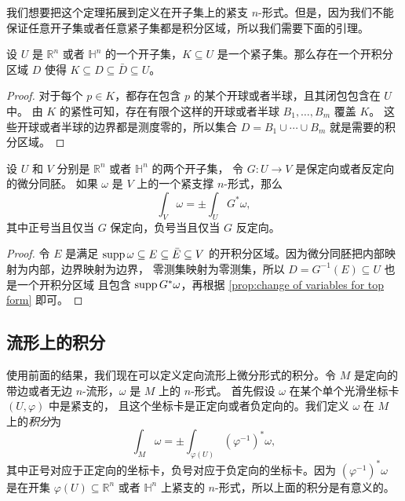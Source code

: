 我们想要把这个定理拓展到定义在开子集上的紧支 $n$-形式。但是，因为我们不能
保证任意开子集或者任意紧子集都是积分区域，所以我们需要下面的引理。

\begin{lemma}
  设 $U$ 是 $\mathbb{R}^n$ 或者 $\mathbb{H}^n$ 的一个开子集，$K\subseteq U$
  是一个紧子集。那么存在一个开积分区域 $D$ 使得 $K\subseteq D\subseteq\bar D\subseteq U$。
\end{lemma}
\begin{proof}
  对于每个 $p\in K$，都存在包含 $p$ 的某个开球或者半球，且其闭包包含在 $U$ 中。
  由 $K$ 的紧性可知，存在有限个这样的开球或者半球 $B_1,\dots,B_m$ 覆盖 $K$。
  这些开球或者半球的边界都是测度零的，所以集合 $D=B_1\cup\cdots\cup B_m$
  就是需要的积分区域。
\end{proof}

\begin{proposition}\label{prop:change of variables for top form on open set}
  设 $U$ 和 $V$ 分别是 $\mathbb{R}^n$ 或者 $\mathbb{H}^n$ 的两个开子集，
  令 $G:U\to V$ 是保定向或者反定向的微分同胚。
  如果 $\omega$ 是 $V$ 上的一个紧支撑 $n$-形式，那么
  \[
    \int_V\omega=\pm\int_U G^*\omega,
  \]
  其中正号当且仅当 $G$ 保定向，负号当且仅当 $G$ 反定向。
\end{proposition}
\begin{proof}
  令 $E$ 是满足 $\operatorname{supp}\omega\subseteq E\subseteq \bar E\subseteq V$
  的开积分区域。因为微分同胚把内部映射为内部，边界映射为边界，
  零测集映射为零测集，所以 $D=G^{-1}(E)\subseteq U$ 也是一个开积分区域
  且包含 $\operatorname{supp} G^*\omega$，再根据 \autoref{prop:change of variables for top form}
  即可。
\end{proof}

\subsection{流形上的积分}

使用前面的结果，我们现在可以定义定向流形上微分形式的积分。令
$M$ 是定向的带边或者无边 $n$-流形，$\omega$ 是 $M$ 上的 $n$-形式。
首先假设 $\omega$ 在某个单个光滑坐标卡 $(U,\varphi)$ 中是紧支的，
且这个坐标卡是正定向或者负定向的。我们定义 $\omega$ 在 $M$ 上的\emph{积分}为
\begin{equation}
  \int_M\omega=\pm\int_{\varphi(U)}(\varphi^{-1})^*\omega,
\end{equation}
其中正号对应于正定向的坐标卡，负号对应于负定向的坐标卡。因为
$(\varphi^{-1})^*\omega$ 是在开集 $\varphi(U)\subseteq \mathbb{R}^n$
或者 $\mathbb{H}^n$ 上紧支的 $n$-形式，所以上面的积分是有意义的。

